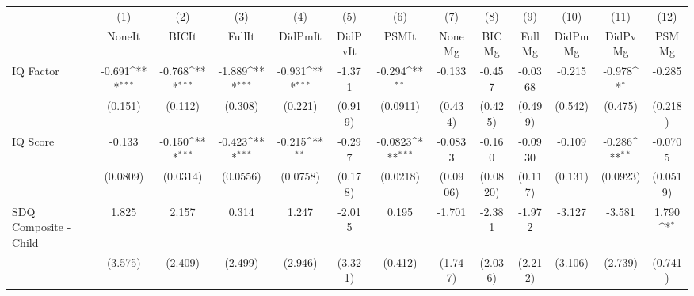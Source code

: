 {
\def\sym#1{\ifmmode^{#1}\else\(^{#1}\)\fi}
\begin{tabular}{l*{12}{c}}
\toprule
            &\multicolumn{1}{c}{(1)}&\multicolumn{1}{c}{(2)}&\multicolumn{1}{c}{(3)}&\multicolumn{1}{c}{(4)}&\multicolumn{1}{c}{(5)}&\multicolumn{1}{c}{(6)}&\multicolumn{1}{c}{(7)}&\multicolumn{1}{c}{(8)}&\multicolumn{1}{c}{(9)}&\multicolumn{1}{c}{(10)}&\multicolumn{1}{c}{(11)}&\multicolumn{1}{c}{(12)}\\
            &\multicolumn{1}{c}{NoneIt}&\multicolumn{1}{c}{BICIt}&\multicolumn{1}{c}{FullIt}&\multicolumn{1}{c}{DidPmIt}&\multicolumn{1}{c}{DidPvIt}&\multicolumn{1}{c}{PSMIt}&\multicolumn{1}{c}{NoneMg}&\multicolumn{1}{c}{BICMg}&\multicolumn{1}{c}{FullMg}&\multicolumn{1}{c}{DidPmMg}&\multicolumn{1}{c}{DidPvMg}&\multicolumn{1}{c}{PSMMg}\\
\midrule
IQ Factor   &      -0.691\sym{***}&      -0.768\sym{***}&      -1.889\sym{***}&      -0.931\sym{***}&      -1.371         &      -0.294\sym{**} &      -0.133         &      -0.457         &     -0.0368         &      -0.215         &      -0.978\sym{*}  &      -0.285         \\
            &     (0.151)         &     (0.112)         &     (0.308)         &     (0.221)         &     (0.919)         &    (0.0911)         &     (0.434)         &     (0.425)         &     (0.499)         &     (0.542)         &     (0.475)         &     (0.218)         \\
\addlinespace
IQ Score    &      -0.133         &      -0.150\sym{***}&      -0.423\sym{***}&      -0.215\sym{**} &      -0.297         &     -0.0823\sym{***}&     -0.0833         &      -0.160         &     -0.0930         &      -0.109         &      -0.286\sym{**} &     -0.0705         \\
            &    (0.0809)         &    (0.0314)         &    (0.0556)         &    (0.0758)         &     (0.178)         &    (0.0218)         &    (0.0906)         &    (0.0820)         &     (0.117)         &     (0.131)         &    (0.0923)         &    (0.0519)         \\
\addlinespace
SDQ Composite - Child&       1.825         &       2.157         &       0.314         &       1.247         &      -2.015         &       0.195         &      -1.701         &      -2.381         &      -1.972         &      -3.127         &      -3.581         &       1.790\sym{*}  \\
            &     (3.575)         &     (2.409)         &     (2.499)         &     (2.946)         &     (3.321)         &     (0.412)         &     (1.747)         &     (2.036)         &     (2.212)         &     (3.106)         &     (2.739)         &     (0.741)         \\

\end{tabular}}
